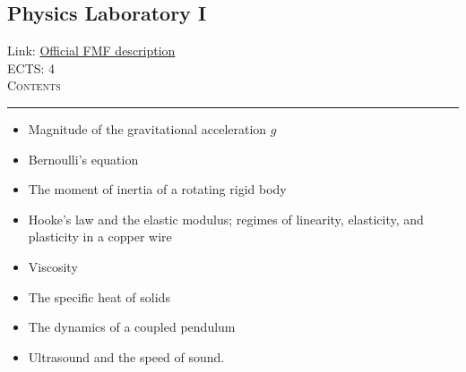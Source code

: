 \documentclass[11pt, a4paper]{article}
\newenvironment{course}[3]{
\subsection{#1}%
Link: \href{#2}{Official FMF description}\\%
ECTS: #3%
\vspace{1ex}
\\
{\large \textsc{Contents}}\\[-0.9ex]%
\rule{\textwidth}{0.5pt}
\vspace{-3ex}
}
{}
\newenvironment{chapter}[1]{
\begin{tcolorbox}[title=#1, breakable]
}
{\end{tcolorbox}}
\begin{document}
\begin{course}{Physics Laboratory I}{https://www.fmf.uni-lj.si/en/study-physics/programmes/1fiz/2020/7000777/courses/1142/}{4}
    \label{physics_laboratory_1}

    \begin{chapter}{Experiments}
        \begin{itemize}
        
            \item Magnitude of the gravitational acceleration $ g $

            \item Bernoulli's equation

            \item The moment of inertia of a rotating rigid body

            \item Hooke's law and the elastic modulus; regimes of linearity, elasticity, and plasticity in a copper wire

            \item Viscosity

            \item The specific heat of solids

            \item The dynamics of a coupled pendulum

            \item Ultrasound and the speed of sound.
        
        \end{itemize}
    \end{chapter}

\end{course}
\end{document}

